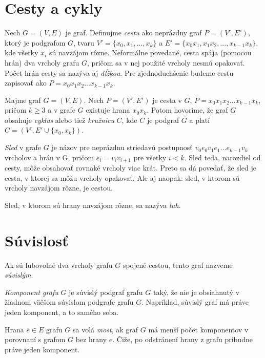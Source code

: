 \section{Cesty a cykly}

Nech $G = (V, E)$ je graf. Definujme \textit{cestu} ako neprázdny graf $P = (V', E')$, ktorý je podgrafom $G$, tvaru $V' = \{x_{0}, x_{1}, ..., x_{k}\}$ a $E' = \{x_{0} x_{1}, x_{1} x_{2}, ..., x_{k-1} x_{k}\}$, kde všetky $x_{i}$ sú navzájom rôzne. Neformálne povedané, cesta spája (pomocou hrán) dva vrcholy grafu $G$, pričom sa v nej použité vrcholy nesmú opakovať. Počet hrán cesty sa nazýva aj \textit{dĺžkou}. Pre zjednoduchšenie budeme cestu zapisovať ako $P = x_{0} x_{1} x_{2} ... x_{k-1} x_{k}$.\newline

Majme graf $G = (V, E)$. Nech $P = (V', E')$ je cesta v $G$, $P = x_{0} x_{1} x_{2} ... x_{k-1} x_{k}$, pričom $k\geq 3$ a v grafe $G$ existuje hrana $x_{0}x_{k}$. Potom hovoríme, že graf $G$ obsahuje \textit{cyklus} alebo tiež \textit{kružnicu} $C$, kde $C$ je podgraf $G$ a platí $C = (V', E' \cup \{x_{0},x_{k}\})$. \newline

\textit{Sled} v grafe $G$ je názov pre neprázdnu striedavú postupnosť $v_{0}e_{0}v_{1}e_{1} ... e_{k-1}v_{k}$ vrcholov a hrán v G, pričom $e_{i} = v_{i}v_{i+1}$ pre všetky $i < k$. Sled teda, narozdiel od cesty, môže obsahovať rovnaké vrcholy viac krát. Preto sa dá povedať, že sled je cesta, v ktorej sa môžu vrcholy opakovať. Ale aj naopak: sled, v ktorom sú vrcholy navzájom rôzne, je cestou.\newline

Sled, v ktorom sú hrany navzájom rôzne, sa nazýva \textit{ťah}.\newline


\section{Súvislosť}

Ak sú ľubovoľné dva vrcholy grafu $G$ spojené cestou, tento graf nazveme \textit{súvislým}. \newline

\textit{Komponent grafu} $G$ je súvislý podgraf grafu $G$ taký, že nie je obsiahnutý v žiadnom väčšom súvislom podgrafe grafu $G$. Napríklad, súvislý graf má práve jeden komponent, a to samého seba.\newline

Hrana $e \in E$ grafu $G$ sa volá \textit{most}, ak graf $G$ má menší počet komponentov v porovnaní s grafom $G$ bez hrany $e$. Čiže, po odstránení hrany z grafu pribudne práve jeden komponent.\newline

